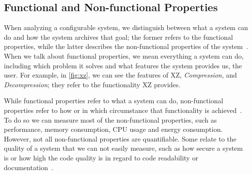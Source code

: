 \subsection{Functional and Non-functional Properties}\label{ch:properties}

When analyzing a configurable system, we distinguish between what a system can do and how the system archives that goal;
the former refers to the functional properties, while the latter describes the non-functional properties of the system~\cite{non-functional-Properties}.
When we talk about functional properties, we mean everything a system can do, including which problem it solves and what features the system provides us, 
the user.
For example, in \autoref{fig:xz}, we can see the features of \textsc{XZ}, \textit{Compression}, 
and \textit{Decompression}; they refer to the functionality \textsc{XZ} provides.

While functional properties refer to what a system can do, non-functional properties refer to how or in which circumstance
that functionality is achieved~\cite{non-functional-Properties}. 
To do so we can measure most of the non-functional properties, such as performance, memory consumption, CPU usage and energy consumption. 
However, not all non-functional properties are quantifiable. Some relate to the quality of a system that we can not easily measure, such as
how secure a system is or how high the code quality is in regard to code readability or documentation~\cite{non-functional-Properties}.